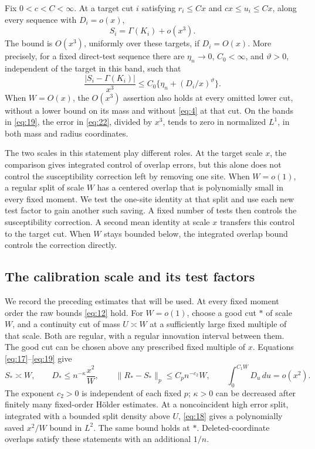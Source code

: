\begin{proposition}\label{prop:cavity-closure}
Fix \(0<c<C<\infty\). At a target cut \(i\) satisfying
\(r_i\le Cx\) and \(cx\le u_i\le Cx\), along every sequence with
\(D_i=o(x)\),
\begin{equation}\label{eq:22}\tag{22}
                         S_i=\Gamma(K_i)+o(x^3).
\end{equation}
The bound is \(O(x^3)\), uniformly over these targets, if \(D_i=O(x)\).
More precisely, for a fixed direct-test sequence there are
\(\eta_n\to0\), \(C_0<\infty\), and \(\vartheta>0\), independent of
the target in this band, such that
\[
 \frac{|S_i-\Gamma(K_i)|}{x^3}
       \le C_0\{\eta_n+(D_i/x)^\vartheta\}.
\]
When \(W=O(x)\), the \(O(x^3)\) assertion also holds at every omitted
lower cut, without a lower bound on its mass and without
\eqref{eq:4} at that cut. On the bands in \eqref{eq:19},
the error in \eqref{eq:22}, divided by \(x^3\), tends to zero in
normalized \(L^1\), in both mass and radius coordinates.
\end{proposition}

The two scales in this statement play different roles. At the target
scale \(x\), the comparison gives integrated control of overlap errors,
but this alone does not control the susceptibility correction left by
removing one site. When \(W=o(1)\), a regular split of scale \(W\)
has a centered overlap that is polynomially small in every fixed
moment. We test the one-site identity at that split and use each new
test factor to gain another such saving. A fixed number of tests then
controls the susceptibility correction. A second mean identity at
scale \(x\) transfers this control to the target cut. When \(W\)
stays bounded below, the integrated overlap bound controls the
correction directly.

\subsection{The calibration scale and its test factors}

We record the preceding estimates that will be used. At every fixed
moment order the raw bounds \eqref{eq:12} hold. For \(W=o(1)\), choose
a good cut \(*\) of scale \(W\), and a continuity cut of mass
\(U\asymp W\) at a sufficiently large fixed multiple of that scale.
Both are regular, with a regular innovation interval between them.
The good cut can be chosen above any prescribed fixed multiple of
\(x\). Equations \eqref{eq:17}--\eqref{eq:19} give
\[
 S_*\asymp W,\qquad
 D_*\le n^{-\kappa}\frac{x^2}{W},\qquad
 \|R_*-S_*\|_p\le C_p n^{-c_2}W,\qquad
 \int_0^{C_1W}D_u\,du=o(x^2).
\]
The exponent \(c_2>0\) is independent of each fixed \(p\);
\(\kappa>0\) can be decreased after finitely many fixed-order
H\"older estimates. At a noncoincident high error split, integrated
with a bounded split density above \(U\), \eqref{eq:18} gives a
polynomially saved \(x^2/W\) bound in \(L^2\). The same bound holds
at \(*\). Deleted-coordinate overlaps satisfy these statements with
an additional \(1/n\).

